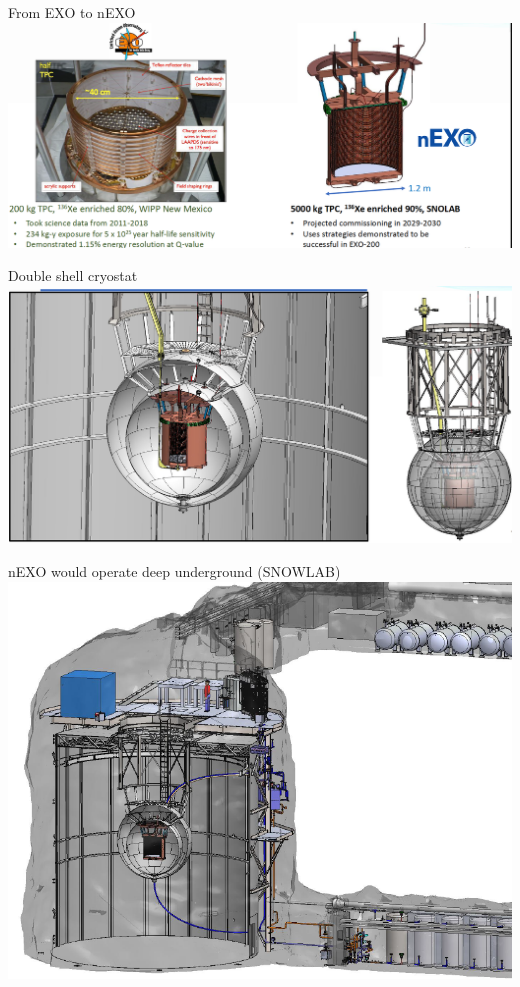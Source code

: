 \documentclass [aspectratio=169]{beamer}
\begin{document}
\begin{frame}{From EXO to nEXO}
\includegraphics[scale=0.30]{exonexo.png}
\end{frame}


\begin{frame}{Double shell cryostat}
\includegraphics[scale=0.30]{nexoinsnow.png}
\end{frame}

\begin{frame}{nEXO would operate deep underground (SNOWLAB)}
\includegraphics[scale=0.30]{nexosnowlab.png}
\end{frame}
\end{document}

